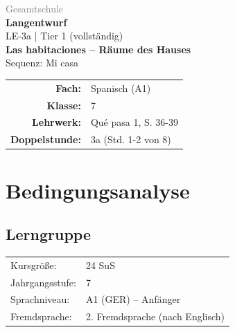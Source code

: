 \documentclass[11pt,a4paper]{article}
\newcommand{\fach}{Spanisch}
\newcommand{\jahrgangsstufe}{7}
\newcommand{\schulart}{Gesamtschule}
\newcommand{\stundenthema}{Las habitaciones -- Räume des Hauses}
\newcommand{\reihenthema}{Mi casa}
\newcommand{\stundennummer}{3a}
\newcommand{\gerniveau}{A1}
\newcommand{\lehrwerk}{Qué pasa 1}
\newcommand{\lehrwerkseite}{S. 36-39}
\newcommand{\lerngruppengroesse}{24}
\begin{document}
\begin{titlepage}
    \centering
    \vspace*{2cm}
    {\large\textcolor{gray}{\schulart}}\\[2cm]
    {\Huge\textcolor{fach}{\textbf{Langentwurf}}}\\[0.5cm]
    {\large LE-\stundennummer{} | Tier 1 (vollständig)}\\[2cm]
    {\LARGE\textbf{\stundenthema}}\\[0.5cm]
    {\large Sequenz: \reihenthema}\\[2cm]
    \begin{tabular}{rl}
        \textbf{Fach:} & \fach{} (\gerniveau) \\[0.3cm]
        \textbf{Klasse:} & \jahrgangsstufe \\[0.3cm]
        \textbf{Lehrwerk:} & \lehrwerk, \lehrwerkseite \\[0.3cm]
        \textbf{Doppelstunde:} & \stundennummer{} (Std. 1-2 von 8) \\[0.3cm]
    \end{tabular}
    \vfill
\end{titlepage}

\tableofcontents
\newpage

\section{Bedingungsanalyse}

\subsection{Lerngruppe}
\begin{tabular}{ll}
    Kursgröße: & \lerngruppengroesse{} SuS \\
    Jahrgangsstufe: & \jahrgangsstufe \\
    Sprachniveau: & \gerniveau{} (GER) -- Anfänger \\
    Fremdsprache: & 2. Fremdsprache (nach Englisch) \\
\end{tabular}
\end{document}
